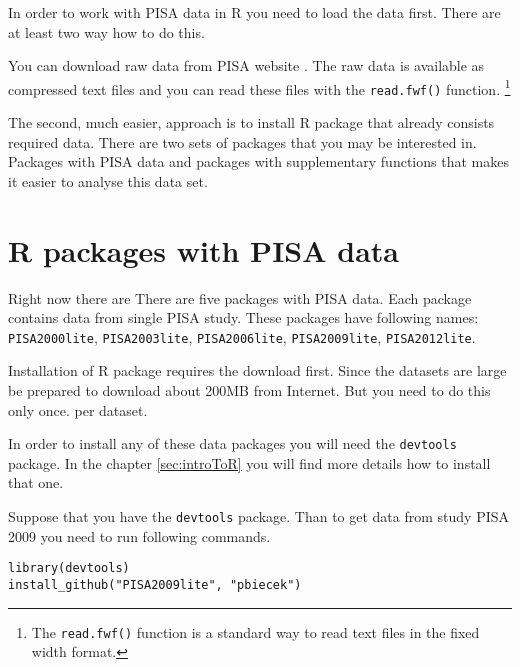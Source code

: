 In order to work with PISA data in R you need to load the data first. There are at least two way how to do this.

You can download raw data from PISA website \cite{PISAwebsite}. The raw data is available as compressed text files and you can read these files with the \texttt{read.fwf()} function. \footnote{The \texttt{read.fwf()} function is a standard way to read text files in the fixed width format.} 

The second, much easier, approach is to install R package that already consists required data. There are two sets of packages that you may be interested in. Packages with PISA data and packages with supplementary functions that makes it easier to analyse this data set.

\section{R packages with PISA data}
Right now there are There are five packages with PISA data. Each package contains data from single PISA study. These packages have following names: \verb:PISA2000lite:, \verb:PISA2003lite:, \verb:PISA2006lite:, \verb:PISA2009lite:, \verb:PISA2012lite:.

Installation of R package requires the download first. Since the datasets are large be prepared to download about 200MB from Internet. But you need to do this only once. per dataset.

In order to install any of these data packages you will need the \verb:devtools: package. In the chapter \ref{sec:introToR} you will find more details how to install that one.

Suppose that you have the \verb:devtools: package. Than to get data from study PISA 2009 you need to run following commands.

\begin{shaded}\begin{verbatim}
library(devtools)
install_github("PISA2009lite", "pbiecek")
\end{verbatim}\end{shaded}

